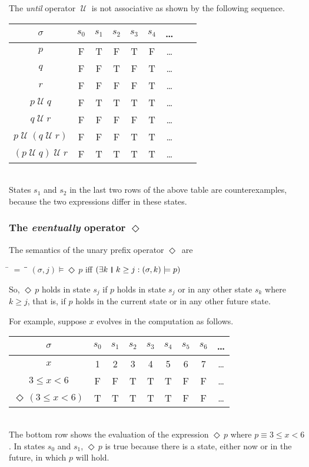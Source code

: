 \documentclass[12pt, fleqn, leqno]{article}
\newcommand{\lllgap}{12pt}                          %
\newcommand{\mymathindent}{24pt}                    %
\newcommand{\Until}{\;\mathcal{U}\;}
\newcommand{\Event}{\Diamond\,}
\newcommand{\myqedtab}{\hspace{384pt}}              %
\newcommand{\thedr}{\rule[-.25ex]{.32mm}{1.75ex}}   %
\newcommand{\dr}{\;\,\thedr\,\;}                    %
\newcommand{\rb}{:}                                 %
\newcommand{\ext}{\exists}                          %
\begin{document}
The \textit{until} operator $\Until$ is not associative as shown by the following sequence.\\[\lllgap]
\begin{tabular}{c|cccccccc}
  $\sigma$                  & $s_0$ & $s_1$ & $s_2$ & $s_3$ & $s_4$ & \dots \\
  \hline
  $p$                       & F     & T     & F     & T     & F     &  \dots\\
  $q$                       & F     & F     & T     & F     & T     &  \dots\\
  $r$                       & F     & F     & F     & F     & T     &  \dots\\
  $p\Until q$               & F     & T     & T     & T     & T     &  \dots\\
  $q\Until r$               & F     & F     & F     & F     & T     &  \dots\\
  $p\Until (q\Until r)$     & F     & F     & F     & T     & T     &  \dots\\
  $(p\Until q)\Until r$     & F     & T     & T     & T     & T     &  \dots
\end{tabular}\\[\lllgap]
States $s_1$ and $s_2$ in the last two rows of the above table are counterexamples, because the two expressions differ in these states.

\subsubsection*{The \textit{eventually} operator $\Event$}

The semantics of the unary prefix operator $\Event$ are
\begin{tabbing}
\hspace{\mymathindent} \= $= \;$ \= \myqedtab \= \kill
  \> $(\sigma, j) \models \Event p$ \quad iff \quad $(\ext k \dr k \ge j \rb (\sigma,k) \models p)$
\end{tabbing}
So, $\Event p$ holds in state $s_j$ if $p$ holds in state $s_j$ or in any other state $s_k$ where $k\ge j$, that is, if $p$ holds in the current state or in any other future state.

For example, suppose $x$ evolves in the computation as follows.\\[\lllgap]
\begin{tabular}{c|cccccccc}
  $\sigma$                  & $s_0$ & $s_1$ & $s_2$ & $s_3$ & $s_4$ & $s_5$ & $s_6$ & \dots \\
  \hline
  $x$                       & 1     & 2     & 3     & 4     & 5     & 6     & 7     &  \dots\\
  $3\le x<6$                & F     & F     & T     & T     & T     & F     & F     &  \dots\\
  $\Event(3\le x<6)$        & T     & T     & T     & T     & T     & F     & F     &  \dots\\
\end{tabular}\\[\lllgap]
The bottom row shows the evaluation of the expression $\Event p$ where $p\equiv 3\le x<6$.
In states $s_0$ and $s_1$, $\Event p$ is true because there is a state, either now or in the future, in which $p$ will hold.
\end{document}
